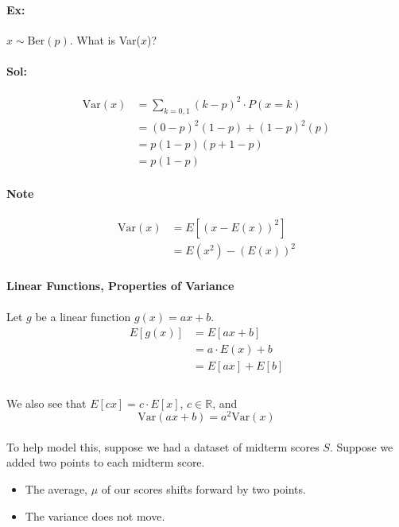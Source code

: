 \documentclass[letterpaper,12pt]{article}
\begin{document}
\paragraph{Ex:}$x \sim \mathrm{Ber}(p)$. What is Var($x$)?
\paragraph{Sol:}
\begin{align*}
    \mathrm{Var}(x) &= \sum_{k=0,1} (k-p)^2 \cdot P(x=k)\\
                    &= (0-p)^2(1-p) + (1-p)^2(p)\\
                    &= p(1-p)(p+1-p)\\
                    &= p(1-p)
\end{align*}
\paragraph{Note}
\begin{align*}
    \mathrm{Var}(x) &= E[(x-E(x))^2]\\
                    &= E(x^2) - (E(x))^2
\end{align*}

\paragraph{Linear Functions, Properties of Variance}
\paragraph{}Let $g$ be a linear function $g(x)= ax+b$.
\begin{align*}
    E[g(x)] &= E[ax+b]\\
            &= a\cdot E(x)+b\\
            &= E[ax] + E[b]\\
\end{align*}
\paragraph{}We also see that $E[cx] = c\cdot E[x]$, $c \in \mathbb{R}$, and
\[
    \mathrm{Var}(ax+b) = a^2 \mathrm{Var}(x)
\]
\paragraph{}To help model this, suppose we had a dataset of midterm scores $S$. Suppose we added
two points to each midterm score.
\begin{itemize}
    \item The average, $\mu$ of our scores shifts forward by two points.
    \item The variance does not move.
\end{itemize}
\end{document}
